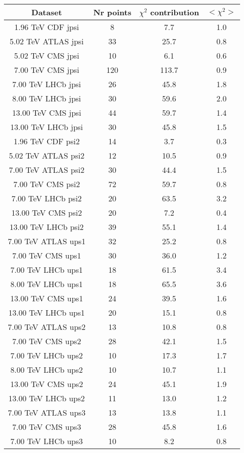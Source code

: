 \begin{table}[h!]
\centering
\begin{tabular}{c|c|c|c}
Dataset & Nr points & $\chi^2$ contribution & $<\chi^2>$ \\
\hline
1.96 TeV CDF jpsi & 8 & 7.7 & 1.0 \\
5.02 TeV ATLAS jpsi & 33 & 25.7 & 0.8 \\
5.02 TeV CMS jpsi & 10 & 6.1 & 0.6 \\
7.00 TeV CMS jpsi & 120 & 113.7 & 0.9 \\
7.00 TeV LHCb jpsi & 26 & 45.8 & 1.8 \\
8.00 TeV LHCb jpsi & 30 & 59.6 & 2.0 \\
13.00 TeV CMS jpsi & 44 & 59.7 & 1.4 \\
13.00 TeV LHCb jpsi & 30 & 45.8 & 1.5 \\
1.96 TeV CDF psi2 & 14 & 3.7 & 0.3 \\
5.02 TeV ATLAS psi2 & 12 & 10.5 & 0.9 \\
7.00 TeV ATLAS psi2 & 30 & 44.4 & 1.5 \\
7.00 TeV CMS psi2 & 72 & 59.7 & 0.8 \\
7.00 TeV LHCb psi2 & 20 & 63.5 & 3.2 \\
13.00 TeV CMS psi2 & 20 & 7.2 & 0.4 \\
13.00 TeV LHCb psi2 & 39 & 55.1 & 1.4 \\
7.00 TeV ATLAS ups1 & 32 & 25.2 & 0.8 \\
7.00 TeV CMS ups1 & 30 & 36.0 & 1.2 \\
7.00 TeV LHCb ups1 & 18 & 61.5 & 3.4 \\
8.00 TeV LHCb ups1 & 18 & 65.5 & 3.6 \\
13.00 TeV CMS ups1 & 24 & 39.5 & 1.6 \\
13.00 TeV LHCb ups1 & 20 & 15.1 & 0.8 \\
7.00 TeV ATLAS ups2 & 13 & 10.8 & 0.8 \\
7.00 TeV CMS ups2 & 28 & 42.1 & 1.5 \\
7.00 TeV LHCb ups2 & 10 & 17.3 & 1.7 \\
8.00 TeV LHCb ups2 & 10 & 10.7 & 1.1 \\
13.00 TeV CMS ups2 & 24 & 45.1 & 1.9 \\
13.00 TeV LHCb ups2 & 11 & 13.0 & 1.2 \\
7.00 TeV ATLAS ups3 & 13 & 13.8 & 1.1 \\
7.00 TeV CMS ups3 & 28 & 45.8 & 1.6 \\
7.00 TeV LHCb ups3 & 10 & 8.2 & 0.8 \\

\end{tabular}
\end{table}
